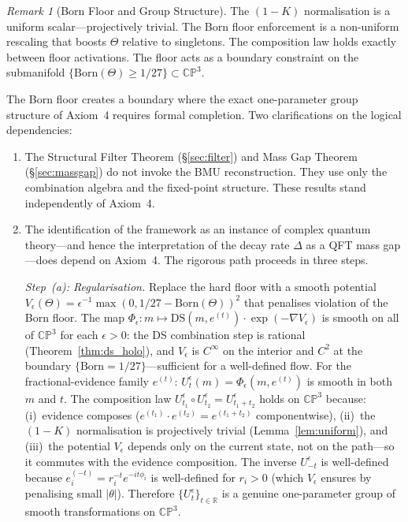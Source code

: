 \documentclass[11pt,a4paper]{article}
\theoremstyle{definition}
\theoremstyle{remark}
\newtheorem{remark}[theorem]{Remark}
\newcommand{\CP}{\mathbb{CP}}
\newcommand{\R}{\mathbb{R}}
\begin{document}
\begin{remark}[Born Floor and Group Structure]\label{rem:axiom4}
The $(1-K)$ normalisation is a uniform scalar---projectively trivial. The Born floor enforcement is a non-uniform rescaling that boosts $\Theta$ relative to singletons. The composition law holds exactly between floor activations. The floor acts as a boundary constraint on the submanifold $\{\mathrm{Born}(\Theta)\geq 1/27\}\subset\CP^3$.

The Born floor creates a boundary where the exact one-parameter group structure of Axiom~4 requires formal completion. Two clarifications on the logical dependencies:
\begin{enumerate}[nosep]
\item The Structural Filter Theorem (\S\ref{sec:filter}) and Mass Gap Theorem (\S\ref{sec:massgap}) do not invoke the BMU reconstruction. They use only the combination algebra and the fixed-point structure. These results stand independently of Axiom~4.
\item The identification of the framework as an instance of complex quantum theory---and hence the interpretation of the decay rate $\Delta$ as a QFT mass gap---does depend on Axiom~4. The rigorous path proceeds in three steps.

\emph{Step~(a): Regularisation.} Replace the hard floor with a smooth potential $V_\epsilon(\Theta)=\epsilon^{-1}\max(0,1/27-\mathrm{Born}(\Theta))^2$ that penalises violation of the Born floor. The map $\Phi_\epsilon:m\mapsto\mathrm{DS}(m,e^{(t)})\cdot\exp(-\nabla V_\epsilon)$ is smooth on all of $\CP^3$ for each $\epsilon>0$: the DS combination step is rational (Theorem~\ref{thm:ds_holo}), and $V_\epsilon$ is $C^\infty$ on the interior and $C^2$ at the boundary $\{\mathrm{Born}=1/27\}$---sufficient for a well-defined flow. For the fractional-evidence family $e^{(t)}$: $U_t^\epsilon(m)=\Phi_\epsilon(m,e^{(t)})$ is smooth in both $m$ and $t$. The composition law $U_{t_1}^\epsilon\circ U_{t_2}^\epsilon=U_{t_1+t_2}^\epsilon$ holds on $\CP^3$ because: (i)~evidence composes ($e^{(t_1)}\cdot e^{(t_2)}=e^{(t_1+t_2)}$ componentwise), (ii)~the $(1-K)$ normalisation is projectively trivial (Lemma~\ref{lem:uniform}), and (iii)~the potential $V_\epsilon$ depends only on the current state, not on the path---so it commutes with the evidence composition. The inverse $U_{-t}^\epsilon$ is well-defined because $e^{(-t)}_i=r_i^{-t}e^{-it\phi_i}$ is well-defined for $r_i>0$ (which $V_\epsilon$ ensures by penalising small $|\theta|$). Therefore $\{U_t^\epsilon\}_{t\in\R}$ is a genuine one-parameter group of smooth transformations on $\CP^3$.


\end{enumerate}
\end{remark}
\end{document}
